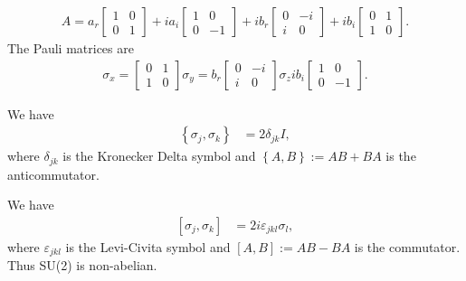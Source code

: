 \documentclass[../../note.tex]{subfiles}
\begin{document}
\begin{align}
    A=
    a_r\left[\begin{matrix}
        1 & 0 \\
        0 & 1   
       \end{matrix}\right]
       +
       i a_i\left[\begin{matrix}
        1 & 0 \\
        0 & -1   
       \end{matrix}\right]
       +    
       i b_r\left[\begin{matrix}
        0 & -i \\
        i & 0   
       \end{matrix}\right]
       +
       i b_i\left[\begin{matrix}
        0 & 1 \\
        1 & 0   
       \end{matrix}\right].
\end{align}
The Pauli matrices are
\begin{align}
       \sigma_x =
       \left[\begin{matrix}
        0 & 1 \\
        1 & 0   
       \end{matrix}\right]
       \sigma_y =     
       b_r\left[\begin{matrix}
        0 & -i \\
        i & 0   
       \end{matrix}\right]
       \sigma_z
       i b_i\left[\begin{matrix}
        1 & 0 \\
        0 & -1   
       \end{matrix}\right].
\end{align}
\begin{lemma}
    We have
    \begin{align}
        \left\{\sigma_j, \sigma_k\right\}
        &= 2 \delta_{jk} I,
    \end{align}
    where $\delta_{jk}$ is the Kronecker Delta symbol and $\left\{A,B\right\} := AB + BA$ is the anticommutator.
\end{lemma}

\begin{lemma}
    We have
    \begin{align}
        \left[\sigma_j, \sigma_k\right]
        &= 2 i \varepsilon_{jkl} \sigma_l,
    \end{align}
    where $\varepsilon_{jkl}$ is the Levi-Civita symbol and $\left[A,B\right] := AB - BA$ is the commutator. Thus SU(2) is non-abelian.
\end{lemma}
\end{document}
